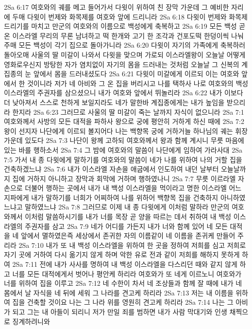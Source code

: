 2Sa 6:17  여호와의 궤를 메고 들어가서 다윗이 위하여 친 장막 가운데 그 예비한 자리에 두매 다윗이 번제와 화목제를 여호와 앞에 드리니라
2Sa 6:18  다윗이 번제와 화목제 드리기를 마치고 만군의 여호와의 이름으로 백성에게 축복하고
2Sa 6:19  모든 백성 곧 온 이스라엘 무리의 무론 남녀하고 떡 한개와 고기 한 조각과 건포도떡 한덩이씩 나눠주매 모든 백성이 각기 집으로 돌아가니라
2Sa 6:20  다윗이 자기의 가족에게 축복하러 돌아오매 사울의 딸 미갈이 나와서 다윗을 맞으며 가로되 이스라엘왕이 오늘날 어떻게 영화로우신지 방탕한 자가 염치없이 자기의 몸을 드러내는 것처럼 오늘날 그 신복의 계집종의 눈 앞에서 몸을 드러내셨도다
2Sa 6:21  다윗이 미갈에게 이르되 이는 여호와 앞에서 한 것이니라 저가 네 아비와 그 온 집을 버리시고 나를 택하사 나로 여호와의 백성 이스라엘의 주권자를 삼으셨으니 내가 여호와 앞에서 뛰놀리라
2Sa 6:22  내가 이보다 더 낮아져서 스스로 천하게 보일지라도 네가 말한바 계집종에게는 내가 높임을 받으리라 한지라
2Sa 6:23  그러므로 사울의 딸 미갈이 죽는 날까지 자식이 없으니라
2Sa 7:1  여호와께서 사방의 모든 대적을 파하사 왕으로 궁에 평안히 거하게 하신 때에
2Sa 7:2  왕이 선지자 나단에게 이르되 볼지어다 나는 백향목 궁에 거하거늘 하나님의 궤는 휘장 가운데 있도다
2Sa 7:3  나단이 왕께 고하되 여호와께서 왕과 함께 계시니 무릇 마음에 있는 바를 행하소서
2Sa 7:4  그 밤에 여호와의 말씀이 나단에게 임하여 가라사대
2Sa 7:5  가서 내 종 다윗에게 말하기를 여호와의 말씀이 네가 나를 위하여 나의 거할 집을 건축하겠느냐
2Sa 7:6  내가 이스라엘 자손을 애굽에서 인도하여 내던 날부터 오늘날까지 집에 거하지 아니하고 장막과 회막에 거하며 행하였나니
2Sa 7:7  무릇 이르라엘 자손으로 더불어 행하는 곳에서 내가 내 백성 이스라엘을 먹이라고 명한 이스라엘 어느 지파에게 내가 말하기를 너희가 어찌하여 나를 위하어 백향목 집을 건축하지 아니하였느냐고 말하였느냐
2Sa 7:8  그러므로 이제 내 종 다윗에게 이처럼 말하라 만군의 여호와께서 이처럼 말씀하시기를 내가 너를 목장 곧 양을 따르는 데서 취하여 내 백성 이스라엘의 주권자를 삼고
2Sa 7:9  네가 어디를 가든지 내가 너와 함께 있어 네 모든 대적을 네 앞에서 멸하였은즉 세상에서 존귀한 자의 이름같이 네 이름을 존귀케 만들어 주리라
2Sa 7:10  내가 또 내 백성 이스라엘을 위하여 한 곳을 정하여 저희를 심고 저희로 자기 곳에 거하여 다시 옮기지 않게 하며 악한 유로 전과 같이 저희를 해하지 못하게 하여
2Sa 7:11  전에 내가 사사를 명하여 내 백성 이스라엘을 다스리던 때와 같지 않게 하고 너를 모든 대적에게서 벗어나 평안케 하리라 여호와가 또 네게 이르노니 여호와가 너를 위하여 집을 이루고
2Sa 7:12  네 수한이 차서 네 조상들과 함께 잘 때에 내가 네 몸에서 날 자식을 네 뒤에 세워 그 나라를 견고케 하리라
2Sa 7:13  저는 내 이름을 위하여 집을 건축할 것이요 나는 그 나라 위를 영원히 견고케 하리라
2Sa 7:14  나는 그 아비가 되고 그는 내 아들이 되리니 저가 만일 죄를 범하면 내가 사람 막대기와 인생 채찍으로 징계하려니와

